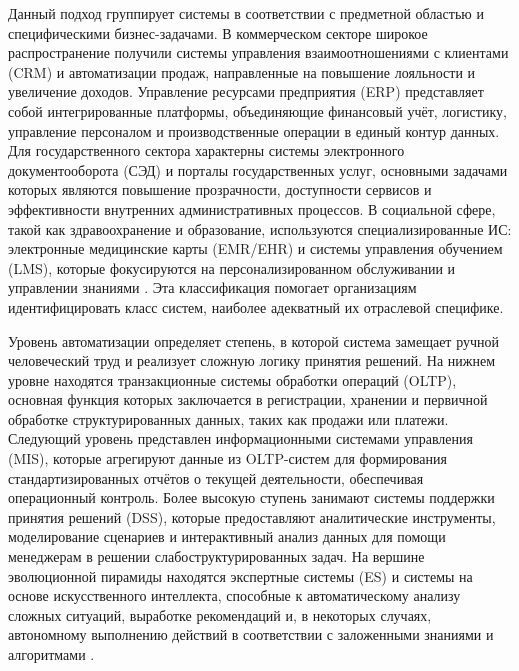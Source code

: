 \documentclass{SibFU-docs}
\begin{document}

Данный подход группирует системы в соответствии с предметной областью и специфическими бизнес-задачами. В коммерческом секторе широкое распространение получили системы управления взаимоотношениями с клиентами (CRM) и автоматизации продаж, направленные на повышение лояльности и увеличение доходов. Управление ресурсами предприятия (ERP) представляет собой интегрированные платформы, объединяющие финансовый учёт, логистику, управление персоналом и производственные операции в единый контур данных. Для государственного сектора характерны системы электронного документооборота (СЭД) и порталы государственных услуг, основными задачами которых являются повышение прозрачности, доступности сервисов и эффективности внутренних административных процессов. В социальной сфере, такой как здравоохранение и образование, используются специализированные ИС: электронные медицинские карты (EMR/EHR) и системы управления обучением (LMS), которые фокусируются на персонализированном обслуживании и управлении знаниями \cite{oecd-digital-economy}. Эта классификация помогает организациям идентифицировать класс систем, наиболее адекватный их отраслевой специфике.


Уровень автоматизации определяет степень, в которой система замещает ручной человеческий труд и реализует сложную логику принятия решений. На нижнем уровне находятся транзакционные системы обработки операций (OLTP), основная функция которых заключается в регистрации, хранении и первичной обработке структурированных данных, таких как продажи или платежи. Следующий уровень представлен информационными системами управления (MIS), которые агрегируют данные из OLTP-систем для формирования стандартизированных отчётов о текущей деятельности, обеспечивая операционный контроль. Более высокую ступень занимают системы поддержки принятия решений (DSS), которые предоставляют аналитические инструменты, моделирование сценариев и интерактивный анализ данных для помощи менеджерам в решении слабоструктурированных задач. На вершине эволюционной пирамиды находятся экспертные системы (ES) и системы на основе искусственного интеллекта, способные к автоматическому анализу сложных ситуаций, выработке рекомендаций и, в некоторых случаях, автономному выполнению действий в соответствии с заложенными знаниями и алгоритмами \cite{iso-iec-15288}.

\end{document}
